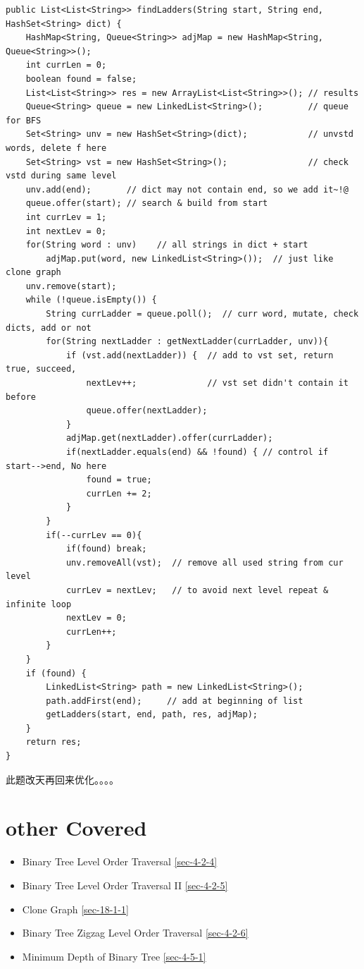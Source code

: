 \documentclass[12pt]{book}
\begin{document}
\begin{lstlisting}
public List<List<String>> findLadders(String start, String end, HashSet<String> dict) {
    HashMap<String, Queue<String>> adjMap = new HashMap<String, Queue<String>>(); 
    int currLen = 0;
    boolean found = false;
    List<List<String>> res = new ArrayList<List<String>>(); // results
    Queue<String> queue = new LinkedList<String>();         // queue for BFS
    Set<String> unv = new HashSet<String>(dict);            // unvstd words, delete f here
    Set<String> vst = new HashSet<String>();                // check vstd during same level
    unv.add(end);       // dict may not contain end, so we add it~!@
    queue.offer(start); // search & build from start
    int currLev = 1;
    int nextLev = 0;
    for(String word : unv)    // all strings in dict + start
        adjMap.put(word, new LinkedList<String>());  // just like clone graph
    unv.remove(start);
    while (!queue.isEmpty()) {
        String currLadder = queue.poll();  // curr word, mutate, check dicts, add or not
        for(String nextLadder : getNextLadder(currLadder, unv)){ 
            if (vst.add(nextLadder)) {  // add to vst set, return true, succeed, 
                nextLev++;              // vst set didn't contain it before
                queue.offer(nextLadder);
            }
            adjMap.get(nextLadder).offer(currLadder); 
            if(nextLadder.equals(end) && !found) { // control if start-->end, No here
                found = true;
                currLen += 2;
            }
        } 
        if(--currLev == 0){
            if(found) break;
            unv.removeAll(vst);  // remove all used string from cur level 
            currLev = nextLev;   // to avoid next level repeat & infinite loop
            nextLev = 0;
            currLen++;
        }
    }
    if (found) {
        LinkedList<String> path = new LinkedList<String>();
        path.addFirst(end);     // add at beginning of list
        getLadders(start, end, path, res, adjMap);
    }
    return res;
}
\end{lstlisting}

此题改天再回来优化。。。。

\section{other Covered}
\label{sec-10-3}
\begin{itemize}
\item Binary Tree Level Order Traversal
\ref{sec-4-2-4}
\item Binary Tree Level Order Traversal II
\ref{sec-4-2-5}
\item Clone Graph        
\ref{sec-18-1-1}
\item Binary Tree Zigzag Level Order Traversal
\ref{sec-4-2-6}
\item Minimum Depth of Binary Tree
\ref{sec-4-5-1}
\end{itemize}
\end{document}
